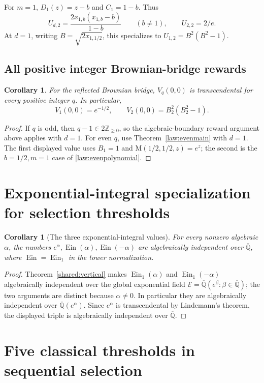 \documentclass[11pt,a4paper]{article}
\newcommand{\Qbar}{\overline{\mathbb Q}}
\newcommand{\M}{\mathrm M}
\DeclareMathOperator{\Ein}{Ein}
\newtheorem{corollary}[theorem]{Corollary}
\theoremstyle{definition}
\theoremstyle{remark}
\numberwithin{equation}{section}
\begin{document}
For $m=1$, $D_1(z)=z-b$ and $C_1=1-b$. Thus
\[
 U_{d,2}=\frac{2x_{1,b}(x_{1,b}-b)}{1-b}\qquad(b\ne1),
 \qquad U_{2,2}=2/e.
\]
At $d=1$, writing $B=\sqrt{2x_{1,1/2}}$, this specializes to
$U_{1,2}=B^2(B^2-1)$.


\subsection{All positive integer Brownian-bridge rewards}
\begin{corollary}\label{opt:value}
For the reflected Brownian bridge, $V_q(0,0)$ is transcendental for
every positive integer $q$. In particular,
\[
 V_1(0,0)=e^{-1/2},\qquad
 V_2(0,0)=B_2^2(B_2^2-1).
\]
\end{corollary}
\begin{proof}
If $q$ is odd, then $q-1\in2\mathbb Z_{\geq0}$, so the
algebraic-boundary reward argument above applies with $d=1$.
For even $q$, use Theorem~\ref{law:evenmain} with $d=1$.
The first displayed value uses $B_1=1$ and
$\M(1/2,1/2,z)=e^z$; the second is the $b=1/2,m=1$ case of
\eqref{law:evenpolynomial}.
\end{proof}


\section{Exponential-integral specialization for selection thresholds}
\begin{corollary}[The three exponential-integral values]
\label{opt:lem:ein-three-values}
For every nonzero algebraic $\alpha$, the numbers
$e^\alpha,\Ein(\alpha),\Ein(-\alpha)$ are algebraically independent
over $\Qbar$, where $\Ein=\Ein_1$ in the tower normalization.
\end{corollary}
\begin{proof}
Theorem~\ref{shared:vertical} makes $\Ein_1(\alpha)$ and
$\Ein_1(-\alpha)$ algebraically independent over the global
exponential field
$\mathcal E=\Qbar(e^\beta:\beta\in\Qbar)$; the two arguments are
distinct because $\alpha\ne0$. In particular they are algebraically
independent over $\Qbar(e^\alpha)$. Since $e^\alpha$ is transcendental
by Lindemann's theorem, the displayed triple is algebraically
independent over $\Qbar$.
\end{proof}

\section{Five classical thresholds in sequential selection}
\label{opt:sec:selection-thresholds}
\end{document}
